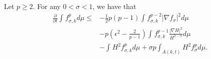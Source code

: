\begin{lemma}
    Let $p \geq 2$. For any $0<\sigma <1 $, we have that 
    \begin{equation*}
        \begin{split}
            \frac{\partial }{\partial t}\int_{}^{}f_{\sigma,k }^{p} d \mu 
        \leq&  -\frac{1}{2} p(p-1) \int_{}^{} f_{\sigma ,k}^{p-2} \left| \nabla f_{\sigma }^{}  \right| ^2 d \mu\\
        & -p\left( \epsilon ^2-\frac{2}{p-1} \right)\int_{}^{} f_{\sigma ,k}^{p-1} \frac{\left| \nabla H \right| ^2}{H^{2-\sigma }} d \mu  \\
        & - \int_{}^{}H^2 f_{\sigma,k }^{p} d \mu +\sigma p \int_{A(k,t)}^{} H ^2  f_{\sigma }^{p} d \mu .
        \end{split}
        \end{equation*} 
\end{lemma}

